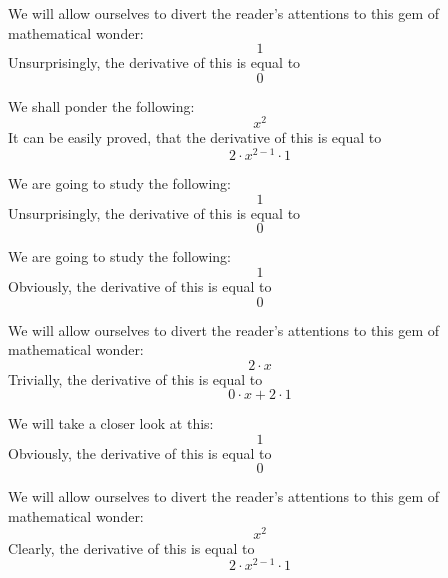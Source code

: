\documentclass{article}
\begin{document}
We will allow ourselves to divert the reader's attentions to this gem of mathematical wonder:
\begin{equation}
1 
\end{equation}
Unsurprisingly, the derivative of this is equal to
\begin{equation}
0 
\end{equation}

We shall ponder the following:
\begin{equation}
x ^{2 } 
\end{equation}
It can be easily proved, that the derivative of this is equal to
\begin{equation}
2 \cdot x ^{2 - 1 } \cdot 1 
\end{equation}

We are going to study the following:
\begin{equation}
1 
\end{equation}
Unsurprisingly, the derivative of this is equal to
\begin{equation}
0 
\end{equation}

We are going to study the following:
\begin{equation}
1 
\end{equation}
Obviously, the derivative of this is equal to
\begin{equation}
0 
\end{equation}

We will allow ourselves to divert the reader's attentions to this gem of mathematical wonder:
\begin{equation}
2 \cdot x 
\end{equation}
Trivially, the derivative of this is equal to
\begin{equation}
0 \cdot x + 2 \cdot 1 
\end{equation}

We will take a closer look at this:
\begin{equation}
1 
\end{equation}
Obviously, the derivative of this is equal to
\begin{equation}
0 
\end{equation}

We will allow ourselves to divert the reader's attentions to this gem of mathematical wonder:
\begin{equation}
x ^{2 } 
\end{equation}
Clearly, the derivative of this is equal to
\begin{equation}
2 \cdot x ^{2 - 1 } \cdot 1 
\end{equation}
\end{document}
